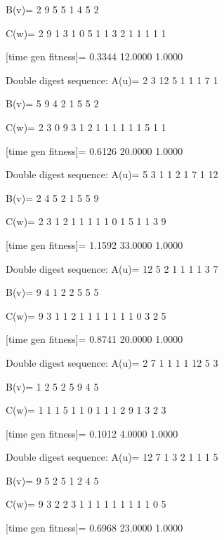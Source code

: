 B(v)=
     2     9     5     5     1     4     5     2

C(w)=
     2     9     1     3     1     0     5     1     1     3     2     1     1     1     1     1

[time gen fitness]=
    0.3344   12.0000    1.0000

Double digest sequence:
A(u)=
     2     3    12     5     1     1     1     7     1

B(v)=
     5     9     4     2     1     5     5     2

C(w)=
     2     3     0     9     3     1     2     1     1     1     1     1     1     5     1     1

[time gen fitness]=
    0.6126   20.0000    1.0000

Double digest sequence:
A(u)=
     5     3     1     1     2     1     7     1    12

B(v)=
     2     4     5     2     1     5     5     9

C(w)=
     2     3     1     2     1     1     1     1     1     0     1     5     1     1     3     9

[time gen fitness]=
    1.1592   33.0000    1.0000

Double digest sequence:
A(u)=
    12     5     2     1     1     1     1     3     7

B(v)=
     9     4     1     2     2     5     5     5

C(w)=
     9     3     1     1     2     1     1     1     1     1     1     1     0     3     2     5

[time gen fitness]=
    0.8741   20.0000    1.0000

Double digest sequence:
A(u)=
     2     7     1     1     1     1    12     5     3

B(v)=
     1     2     5     2     5     9     4     5

C(w)=
     1     1     1     5     1     1     0     1     1     1     2     9     1     3     2     3

[time gen fitness]=
    0.1012    4.0000    1.0000

Double digest sequence:
A(u)=
    12     7     1     3     2     1     1     1     5

B(v)=
     9     5     2     5     1     2     4     5

C(w)=
     9     3     2     2     3     1     1     1     1     1     1     1     1     1     0     5

[time gen fitness]=
    0.6968   23.0000    1.0000


